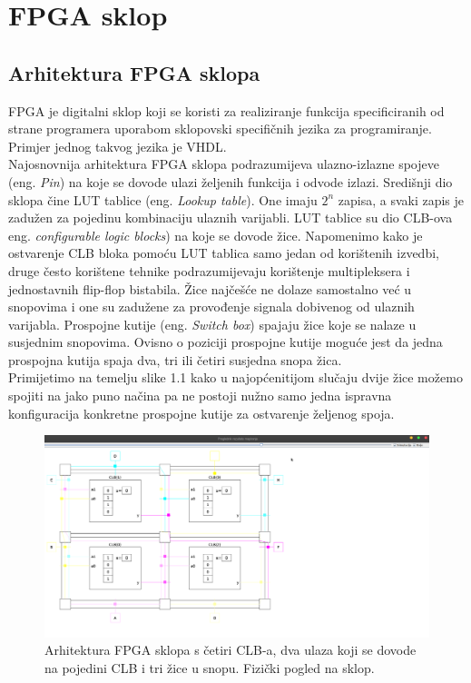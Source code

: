 \documentclass[times, utf8, zavrsni]{fer}
\begin{document}
\section{FPGA sklop}

\subsection{Arhitektura FPGA sklopa}

FPGA je digitalni sklop koji se koristi za realiziranje funkcija specificiranih od strane programera uporabom sklopovski specifičnih jezika za programiranje. Primjer jednog takvog jezika je VHDL.\\ Najosnovnija arhitektura FPGA sklopa podrazumijeva ulazno-izlazne spojeve (eng. \emph{Pin}) na koje se dovode ulazi željenih funkcija i odvode izlazi. Središnji dio sklopa čine LUT tablice (eng. \emph{Lookup table}). One imaju $2^n$ zapisa, a svaki zapis je zadužen za pojedinu kombinaciju ulaznih varijabli. LUT tablice su dio CLB-ova eng. \emph{configurable logic blocks}) na koje se dovode žice. Napomenimo kako je ostvarenje CLB bloka pomoću LUT tablica samo jedan od korištenih izvedbi, druge često korištene tehnike podrazumijevaju korištenje multipleksera i jednostavnih flip-flop bistabila. Žice najčešće ne dolaze samostalno već u snopovima i one su zadužene za provođenje signala dobivenog od ulaznih varijabla. Prospojne kutije (eng. \emph{Switch box}) spajaju žice koje se nalaze u susjednim snopovima. Ovisno o poziciji prospojne kutije moguće jest da jedna prospojna kutija spaja dva, tri ili četiri susjedna snopa žica.\\ Primijetimo na temelju slike 1.1 kako u najopćenitijom slučaju dvije žice možemo spojiti na jako puno načina pa ne postoji nužno samo jedna ispravna konfiguracija konkretne prospojne kutije za ostvarenje željenog spoja.

\begin{figure}[!htb]
\centering
\includegraphics[width=20cm]{slike/arhFPGA.png}
\caption{Arhitektura FPGA sklopa s četiri CLB-a, dva ulaza koji se dovode na pojedini CLB i tri žice u snopu. Fizički pogled na sklop.}
\label{fig:arh-fpga}
\end{figure}
\end{document}
